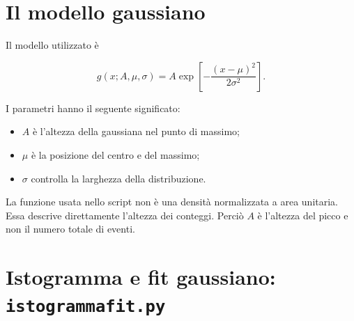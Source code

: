 \section{Il modello gaussiano}

Il modello utilizzato è

\[
g(x;A,\mu,\sigma)=
A\exp\left[-\frac{(x-\mu)^2}{2\sigma^2}\right].
\]

I parametri hanno il seguente significato:

\begin{itemize}
    \item $A$ è l'altezza della gaussiana nel punto di massimo;
    \item $\mu$ è la posizione del centro e del massimo;
    \item $\sigma$ controlla la larghezza della distribuzione.
\end{itemize}

La funzione usata nello script non è una densità normalizzata a area
unitaria. Essa descrive direttamente l'altezza dei conteggi. Perciò $A$
è l'altezza del picco e non il numero totale di eventi.

\section{Istogramma e fit gaussiano: \texttt{istogrammafit.py}}

